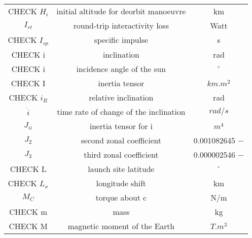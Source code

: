 \begin{center}
\begin{longtable}{c|c|c}
CHECK $H_i$                                 & initial altitude for deorbit manoeuvre     & km \\

$I_{rt}$ 														& round-trip interactivity loss 							& Watt \\

CHECK $I_{sp}$													 	& specific impulse 														& s \\

CHECK i 																	& inclination 																& rad \\

CHECK i                                     & incidence angle of the sun                 & $^\circ$ \\

CHECK I                                      & inertia tensor                          & $km.m^2$ \\

CHECK $i_R$ 															& relative inclination 												& rad \\

$\dot i$ 														& time rate of change of the inclination 			& $rad/s$ \\

$J_{ii}$													 	& inertia tensor for i 												& $m^4$ \\

$J_2$														 		& second zonal coefficient 										& 0.001082645 $-$ \\

$J_3$ 															& third zonal coefficient 										& 0.000002546 $-$ \\

CHECK L                                   & launch site latitude                        & $^\circ$ \\

CHECK $L_x$                                & longitude shift                               & km \\

$M_C$ 															& torque about c 															& N/m \\

CHECK m 																	& mass 																				& kg \\

CHECK M                                    & magnetic moment of the Earth                 & $T.m^3$ \\


\end{longtable}
\end{center}

